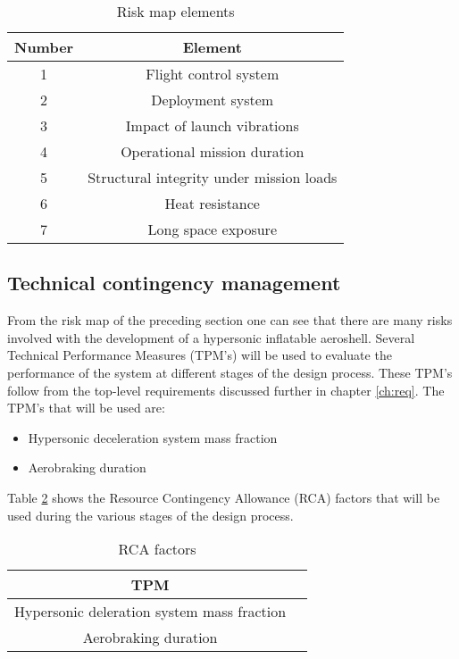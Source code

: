 \begin{table}[h]
\centering
\caption{Risk map elements}
\label{tab:riskelements}
\begin{tabular}{|c|c|}
\hline
\textbf{Number} & \textbf{Element} \\
\hline
1 & Flight control system\\
2 & Deployment system\\
3 & Impact of launch vibrations\\
4 & Operational mission duration\\
5 & Structural integrity under mission loads\\
6 & Heat resistance\\
7 & Long space exposure\\
\hline
\end{tabular}
\end{table}

\subsection{Technical contingency management}
\label{sec:tca}
From the risk map of the preceding section one can see that there are many risks involved with the development of a hypersonic inflatable aeroshell. Several Technical Performance Measures (TPM's) will be used to evaluate the performance of the system at different stages of the design process. These TPM's follow from the top-level requirements discussed further in chapter \ref{ch:req}. The TPM's that will be used are:
\begin{itemize}
	\item Hypersonic deceleration system mass fraction
	\item Aerobraking duration
\end{itemize}
Table \ref{tab:tpm} shows the Resource Contingency Allowance (RCA) factors that will be used during the various stages of the design process.

\begin{table}[h]
	\centering
	\caption{RCA factors}
	\label{tab:tpm}
	\begin{tabular}{|c|c|}
		\hline
		\textbf{TPM} & \\
		\hline
		Hypersonic deleration system mass fraction & \\ \hline
		Aerobraking duration & \\ \hline
	\end{tabular}
\end{table}